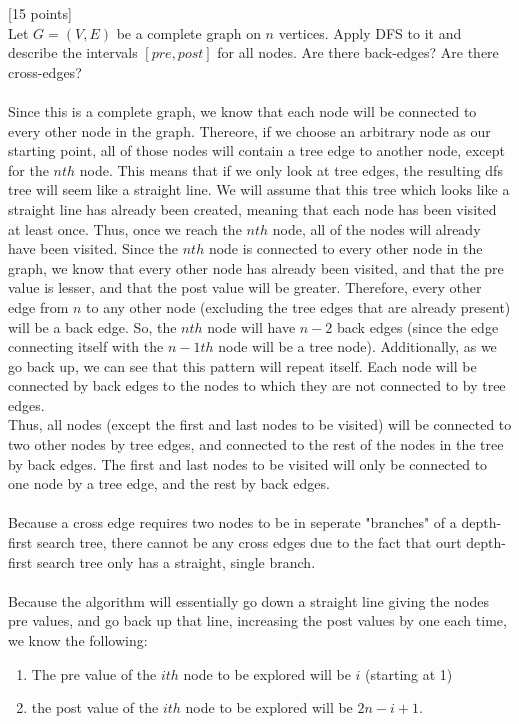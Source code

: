 \documentclass[12pt]{article}
\newcounter{ques}
\newenvironment{question}{\stepcounter{ques}{\noindent\bf Question \arabic{ques}:}}{\vspace{5mm}}
\begin{document}
	\begin{question}[15 points]\\

	Let $G =(V,E)$  be a complete graph on $n$ vertices. Apply DFS to it and describe the intervals $[pre,post]$ for all nodes. Are there back-edges? Are there cross-edges?\\\\

  Since this is a complete graph, we know that each node will be connected to every other node in the graph. Thereore, if we choose an arbitrary node as our starting point, all of those nodes will contain a tree edge to another node, except for the $nth$ node. This means that if we only look at tree edges, the resulting dfs tree will seem like a straight line. We will assume that this tree which looks like a straight line has already been created, meaning that each node has been visited at least once. Thus, once we reach the $nth$ node, all of the nodes will already have been visited. Since the $nth$ node is connected to every other node in the graph, we know that every other node has already been visited, and that the pre value is lesser, and that the post value will be greater. Therefore, every other edge from $n$ to any other node (excluding the tree edges that are already present) will be a back edge. So, the $nth$ node will have $n-2$ back edges (since the edge connecting itself with the $n-1th$ node will be a tree node). Additionally, as we go back up, we can see that this pattern will repeat itself. Each node will be connected by back edges to the nodes to which they are not connected to by tree edges.\\
  Thus, all nodes (except the first and last nodes to be visited) will be connected to two other nodes by tree edges, and connected to the rest of the nodes in the tree by back edges. The first and last nodes to be visited will only be connected to one node by a tree edge, and the rest by back edges.\\\\
  Because a cross edge requires two nodes to be in seperate "branches" of a depth-first search tree, there cannot be any cross edges due to the fact that ourt depth-first search tree only has a straight, single branch.\\\\

  Because the algorithm will essentially go down a straight line giving the nodes pre values, and go back up that line, increasing the post values by one each time, we know the following:
  \begin{enumerate}
    \item The pre value of the $ith$ node to be explored will be $i$ (starting at 1)
    \item the post value of the $ith$ node to be explored will be $2n-i+1$.
  \end{enumerate}

	\end{question}
\end{document}
